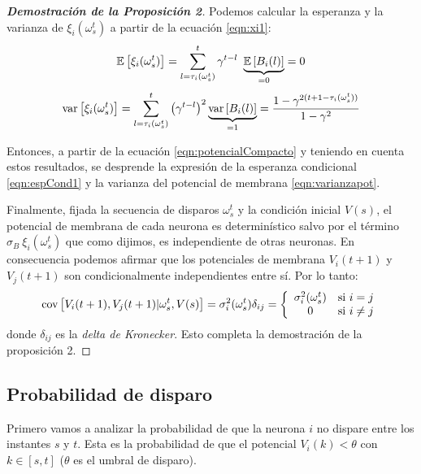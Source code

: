 \begin{proof}[\bf{Demostración de la Proposición 2}]
Podemos calcular la esperanza y la varianza de $\xi_i(\omega_s^t)$ a partir de la ecuación \eqref{eqn:xi1}:
\begin{equation*}
    \mathbb{E} \left[\xi_i(\omega_s^t)\right] = \sum_{l=\tau_i(\omega_s^t)}^t \gamma^{t-l} \  \underbrace{\mathbb{E} \left[B_i(l)\right]}_{=0}=0
\end{equation*}
\begin{equation*}
    \text{var}\left[\xi_i(\omega_s^t)\right] = \sum_{l=\tau_i(\omega_s^t)}^t \left(\gamma^{t-l}\right)^2 \underbrace{\text{var}\left[B_i(l)\right]}_{=1} = \frac{1-\gamma^{2(t+1-\tau_i(\omega_s^t))}}{1-\gamma^2}
\end{equation*}

Entonces, a partir de la ecuación \eqref{eqn:potencialCompacto} y teniendo en cuenta estos resultados, se desprende la expresión de la esperanza condicional \eqref{eqn:espCond1} y la varianza del potencial de membrana \eqref{eqn:varianzapot}.

Finalmente, fijada la secuencia de disparos $\omega_s^t$ y la condición inicial $V(s)$, el potencial de membrana de cada neurona es determinístico salvo por el término $\sigma_B \  \xi_i(\omega_s^t)$ que como dijimos, es independiente de otras neuronas.
En consecuencia podemos afirmar que los potenciales de membrana $V_i(t+1)$ y $V_j(t+1)$ son condicionalmente independientes entre sí. Por lo tanto:
\begin{equation}
    \text{cov}\left[V_i(t+1),V_j(t+1)|\omega_s^t, V(s)\right] = \sigma_i^2(\omega_s^t) \delta_{ij} = \left\{ \begin{array}{cl}
            \sigma_i^2(\omega_s^t)   & \text{si } i=j\\ 
             0    & \text{si } i\neq j
        \end{array}\right.
\end{equation}
donde $\delta_{ij}$ es la \emph{delta de Kronecker}. Esto completa la demostración de la proposición 2.
\end{proof}

\subsection{Probabilidad de disparo}

Primero vamos a analizar la probabilidad de que la neurona $i$ no dispare entre los instantes $s$ y $t$. Esta es la probabilidad de que el potencial $V_i(k) < \theta$ con $k \in [s,t]$ ($\theta$ es el umbral de disparo).

